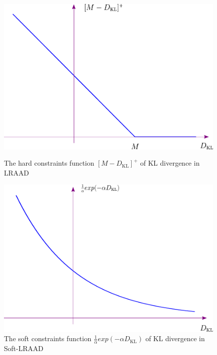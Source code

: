 \documentclass{article}
\begin{document}
\begin{figure}[H]
  \begin{minipage}{0.45\textwidth}
    \centering
    \includegraphics[width=\textwidth]{./assets/hard_constraints.pdf}
    \caption{The hard constraints function $[M - D_{\mathrm{KL}}]^{+}$ of KL divergence in LRAAD}
    \label{fig:hard_constraints}
  \end{minipage}
  \hfill
  \begin{minipage}{0.45\textwidth}
    \centering
    \includegraphics[width=\textwidth]{./assets/soft_constraints.pdf}
    \caption{The soft constraints function $\frac{1}{\alpha}exp(- \alpha D_{\mathrm{KL}})$ of KL divergence in Soft-LRAAD}
    \label{fig:soft_constraints}
  \end{minipage}
\end{figure}
\end{document}
